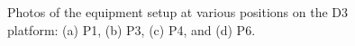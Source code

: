 \begin{figure}
{}
\caption{\label{fig:det_equip}
    Photos of the equipment setup at various positions on the D3 platform: (a) P1, (b) P3, (c) P4, and (d) P6.
}
\end{figure}


